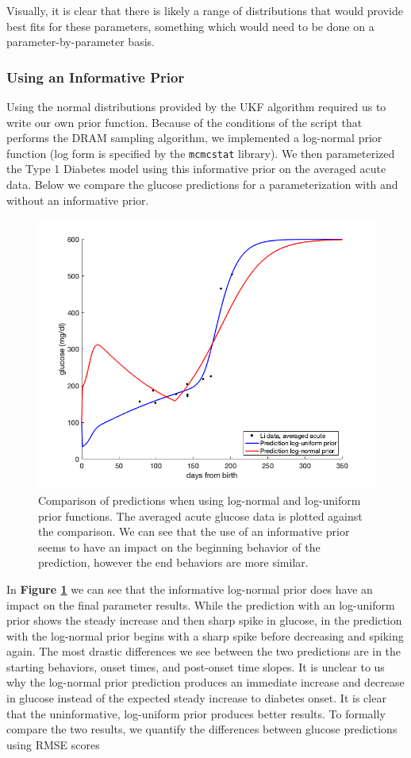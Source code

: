Visually, it is clear that there is likely a range of distributions that would provide best fits for these parameters, something which would need to be done on a parameter-by-parameter basis. 

\subsubsection{Using an Informative Prior}
Using the normal distributions provided by the UKF algorithm required us to write our own prior function. Because of the conditions of the script that performs the DRAM sampling algorithm, we implemented a log-normal prior function (log form is specified by the \texttt{mcmcstat} library). We then parameterized the Type 1 Diabetes model using this informative prior on the averaged acute data. Below we compare the glucose predictions for a parameterization with and without an informative prior.
\begin{figure}[H]
    \centering
    \includegraphics[width=15cm]{Comparison_Figures/dram_priorComp.png}
    \caption{Comparison of predictions when using log-normal and log-uniform prior functions. The averaged acute glucose data is plotted against the comparison. We can see that the use of an informative prior seems to have an impact on the beginning behavior of the prediction, however the end behaviors are more similar.}
    \label{fig:4disc}
\end{figure}
In \textbf{Figure \ref{fig:4disc}} we can see that the informative log-normal prior does have an impact on the final parameter results. While the prediction with an log-uniform prior shows the steady increase and then sharp spike in glucose, in the prediction with the log-normal prior begins with a sharp spike before decreasing and spiking again. The most drastic differences we see between the two predictions are in the starting behaviors, onset times, and post-onset time slopes. It is unclear to us why the log-normal prior prediction produces an immediate increase and decrease in glucose instead of the expected steady increase to diabetes onset. It is clear that the uninformative, log-uniform prior produces better results. To formally compare the two results, we quantify the differences between glucose predictions using RMSE scores
